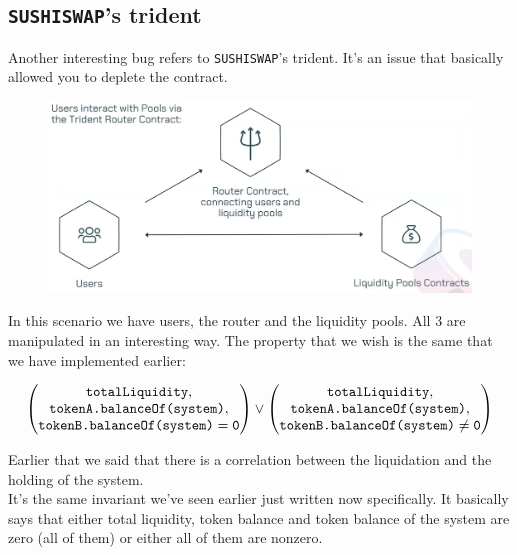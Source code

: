 \documentclass[oneside]{book}
\begin{document}
    \pagebreak

    \subsection{\texttt{SUSHISWAP}'s trident}

    Another interesting bug refers to \texttt{SUSHISWAP}'s trident.
    It's an issue that  basically allowed you to deplete the contract.

    \begin{figure}[htbp!]
        \centering
        \includegraphics[width=\linewidth]{img/sushiswap_trident}
    \end{figure}

    In this scenario we have users, the router and the liquidity pools.
    All $3$ are manipulated in an interesting way.
    The property that we wish is the same that we have implemented earlier:

    $$
    \begin{pmatrix}
        \text{\texttt{totalLiquidity}},\\
        \text{\texttt{tokenA.balanceOf(system)}},\\
        \text{\texttt{tokenB.balanceOf(system)}}=\text{\texttt{0}}
    \end{pmatrix}\vee\begin{pmatrix}
        \text{\texttt{totalLiquidity}},\\
        \text{\texttt{tokenA.balanceOf(system)}},\\
        \text{\texttt{tokenB.balanceOf(system)}}\neq\text{\texttt{0}}
    \end{pmatrix}
    $$

    Earlier that we said that there is a correlation between the liquidation and the holding of the system.\\

    It's the same invariant we've seen earlier just written now specifically.
    It basically says that either total liquidity, token balance and token balance of the system are zero (all of them) or either all of them are nonzero.\\
\end{document}

